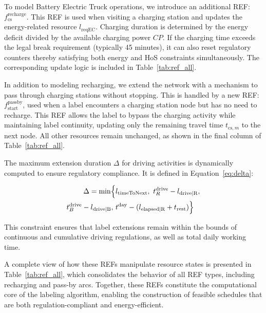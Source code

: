 \documentclass[trsc,dblanonrev]{informs4}
\begin{document}
To model Battery Electric Truck operations, we introduce an additional REF: \( f^{\text{recharge}}_{\text{cs}} \). This REF is used when visiting a charging station and updates the energy-related resource \( l_{\text{reqEC}} \). Charging duration is determined by the energy deficit divided by the available charging power \( CP \). If the charging time exceeds the legal break requirement (typically 45 minutes), it can also reset regulatory counters thereby satisfying both energy and HoS constraints simultaneously. The corresponding update logic is included in Table~\ref{tab:ref_all}.

In addition to modeling recharging, we extend the network with a mechanism to pass through charging stations without stopping. This is handled by a new REF: \( f^{\text{passby}}_{\text{start}} \), used when a label encounters a charging station node but has no need to recharge. This REF allows the label to bypass the charging activity while maintaining label continuity, updating only the remaining travel time \( t_{\text{cs},m} \) to the next node. All other resources remain unchanged, as shown in the final column of Table~\ref{tab:ref_all}.

The maximum extension duration \( \Delta \) for driving activities is dynamically computed to ensure regulatory compliance. It is defined in Equation~\ref{eq:delta}:

\begin{equation}\label{eq:delta}
\begin{aligned}
\Delta = \min \Bigl\{&
l_{\text{timeToNext}},\ 
t^{\text{drive}}_R - l_{\text{drive|R}},\\ 
t^{\text{drive}}_B - l_{\text{drive|B}},\
& t^{\text{day}} - (l_{\text{elapsed|R}} + t_{\text{rest}})
\Bigr\}
\end{aligned}
\end{equation}


This constraint ensures that label extensions remain within the bounds of continuous and cumulative driving regulations, as well as total daily working time.

A complete view of how these REFs manipulate resource states is presented in Table~\ref{tab:ref_all}, which consolidates the behavior of all REF types, including recharging and pass-by arcs. Together, these REFs constitute the computational core of the labeling algorithm, enabling the construction of feasible schedules that are both regulation-compliant and energy-efficient.
\end{document}
